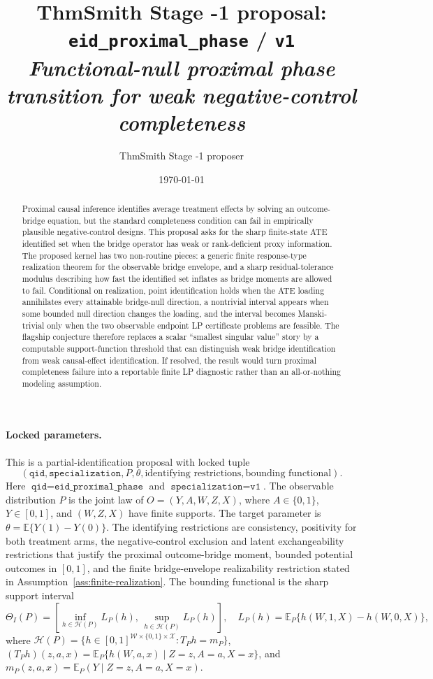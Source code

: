 \documentclass[11pt]{article}
\title{ThmSmith Stage -1 proposal: \texttt{eid\_proximal\_phase} / \texttt{v1}%
  \\ \large\textit{Functional-null proximal phase transition for weak negative-control completeness}}
\author{ThmSmith Stage -1 proposer}
\date{\today}
\newcommand{\E}{\mathbb{E}}
\newcommand{\calH}{\mathcal{H}}
\theoremstyle{definition}
\theoremstyle{plain}
\theoremstyle{remark}
\begin{document}
\maketitle


\paragraph{Locked parameters.}
This is a partial-identification proposal with locked tuple
\[
(\texttt{qid},\texttt{specialization}, P, \theta, \text{identifying restrictions}, \text{bounding functional}).
\]
Here \(\texttt{qid}=\texttt{eid\_proximal\_phase}\) and
\(\texttt{specialization}=\texttt{v1}\).  The observable distribution \(P\) is
the joint law of \(O=(Y,A,W,Z,X)\), where \(A\in\{0,1\}\), \(Y\in[0,1]\), and
\((W,Z,X)\) have finite supports.  The target parameter is
\(\theta=\E\{Y(1)-Y(0)\}\).  The identifying restrictions are consistency,
positivity for both treatment arms, the negative-control exclusion and latent
exchangeability restrictions that justify the proximal outcome-bridge moment,
bounded potential outcomes in \([0,1]\), and the finite bridge-envelope
realizability restriction stated in Assumption~\ref{ass:finite-realization}.
The bounding functional is the sharp support interval
\[
\Theta_I(P)=
\left[
\inf_{h\in\calH(P)} L_P(h),\,
\sup_{h\in\calH(P)} L_P(h)
\right],
\quad
L_P(h)=\E_P\{h(W,1,X)-h(W,0,X)\},
\]
where \(\calH(P)=\{h\in[0,1]^{\mathcal W\times\{0,1\}\times\mathcal X}:T_Ph=m_P\}\),
\((T_Ph)(z,a,x)=\E_P\{h(W,a,x)\mid Z=z,A=a,X=x\}\), and
\(m_P(z,a,x)=\E_P(Y\mid Z=z,A=a,X=x)\).

\begin{abstract}
Proximal causal inference identifies average treatment effects by solving an
outcome-bridge equation, but the standard completeness condition can fail in
empirically plausible negative-control designs.  This proposal asks for the
sharp finite-state ATE identified set when the bridge operator has weak or
rank-deficient proxy information.  The proposed kernel has two non-routine
pieces: a generic finite response-type realization theorem for the observable
bridge envelope, and a sharp residual-tolerance modulus describing how fast
the identified set inflates as bridge moments are allowed to fail.  Conditional
on realization, point identification holds when the ATE loading annihilates
every attainable bridge-null direction, a nontrivial interval appears when
some bounded null direction changes the loading, and the interval becomes
Manski-trivial only when the two observable endpoint LP certificate problems
are feasible.  The flagship conjecture therefore replaces a scalar ``smallest
singular value'' story by a computable support-function threshold that can
distinguish weak bridge identification from weak causal-effect
identification.  If resolved, the result would turn proximal completeness
failure into a reportable finite LP diagnostic rather than an all-or-nothing
modeling assumption.
\end{abstract}
\end{document}
